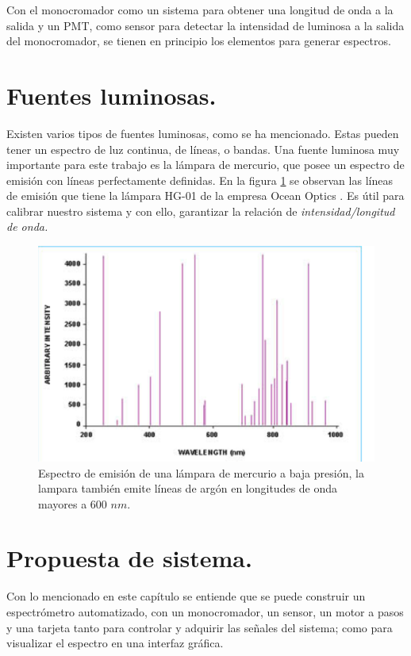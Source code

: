 Con el monocromador como un sistema para obtener una longitud de onda a la salida y un PMT, como sensor para detectar la intensidad de luminosa a la salida del monocromador, se tienen en principio los elementos para generar espectros.

\section{Fuentes luminosas.}
Existen varios tipos de fuentes luminosas, como se ha mencionado. Estas pueden tener un espectro de luz continua, de líneas, o bandas. Una fuente luminosa muy importante para este trabajo es la lámpara de mercurio, que posee un espectro de emisión con líneas perfectamente definidas. En la figura \ref{fig:lamparamercurio} se observan las líneas de emisión que tiene la lámpara HG-01 de la empresa Ocean Optics \cite{Excel2000}. Es útil para calibrar nuestro sistema y con ello, garantizar la relación de \textit{intensidad/longitud de onda.}
\begin{figure}[h]
	\centering
	\includegraphics[width=0.7\linewidth]{Imagenes/lamparaMercurio}
	\caption[Espectro de emisión de una lámpara de mercurio a baja presión.]{Espectro de emisión de una lámpara de mercurio a baja presión, la lampara también emite líneas de argón en longitudes de onda mayores a 600 $nm$. \cite{Excel2000}}
	\label{fig:lamparamercurio}
\end{figure}
\section{Propuesta de sistema.}
Con lo mencionado en este capítulo se entiende que se puede construir un espectrómetro automatizado, con un monocromador, un sensor, un motor a pasos y una tarjeta tanto para controlar y adquirir las señales del sistema; como para visualizar el espectro en una interfaz gráfica. 
